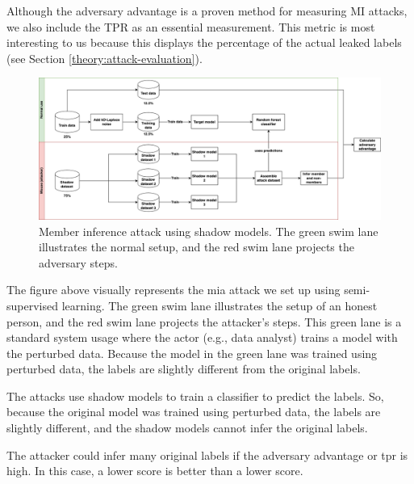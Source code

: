 \begin{enumerate}
        Although the adversary advantage is a proven method for measuring MI attacks, we also include the TPR as an essential measurement.
        This metric is most interesting to us because this displays the percentage of the actual leaked labels (see Section \ref{theory:attack-evaluation}).
        \begin{figure}[H]
          \includegraphics[width=1\textwidth]{Method/images/MI-setup.png}
          \caption{Member inference attack using shadow models. The green swim lane illustrates the normal setup, and the red swim lane projects the adversary steps.}
          \label{figure:mi-attack}
        \end{figure}
        The figure above visually represents the \gls{mia} attack we set up using semi-supervised learning.
        The green swim lane illustrates the setup of an honest person, and the red swim lane projects the attacker's steps.
        This green lane is a standard system usage where the actor (e.g., data analyst) trains a model with the perturbed data.
        Because the model in the green lane was trained using perturbed data, the labels are slightly different from the original labels.

        The attacks use shadow models to train a classifier to predict the labels.
        So, because the original model was trained using perturbed data, the labels are slightly different, and the shadow models cannot infer the original labels. \newline

        The attacker could infer many original labels if the adversary advantage or \gls{tpr} is high.
        In this case, a lower score is better than a lower score.
\end{enumerate}
%
